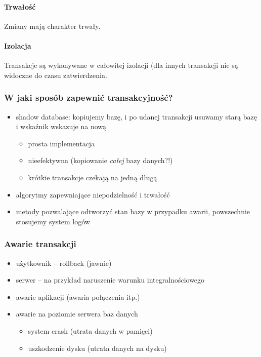 \documentclass[12pt]{article}
\begin{document}
\paragraph{Trwałość}
Zmiany mają charakter trwały.

\paragraph{Izolacja}
Transakcje są wykonywane w całowitej izolacji (dla innych transakcji nie są widoczne
do czasu zatwierdzenia.

\begin{comment}

Stany transakcji:

 active -> partially commited -> commited
 active -> failed
 partially commited -> failed -> aborted

 Gdy nastąpi awaria, to tranakcja zostaje w stanie dowolnym (!)
 Po restarcie SZBD przegląda niedokończone transakcje i doprowadza je do końca
\end{comment}

\subsubsection{W jaki sposób zapewnić transakcyjność?}
\begin{itemize}
  \item shadow database: kopiujemy bazę, i po udanej transakcji usuwamy starą bazę i wskaźnik wskazuje na nową
  \begin{itemize}
    \item prosta implementacja
    \item nieefektywna (kopiowanie \emph{całej} bazy danych?!)
    \item krótkie transakcje czekają na jedną długą
  \end{itemize}
  \item algorytmy zapewniające niepodzielność i trwałość
  \item metody pozwalające odtworzyć stan bazy w przypadku awarii, powszechnie stosujemy system logów
\end{itemize}
\subsubsection{Awarie transakcji}
\begin{itemize}
\item użytkownik -- rollback (jawnie)
\item serwer -- na przykład naruszenie warunku integralnościowego
\item awarie aplikacji (awaria połączenia itp.)
\item awarie na poziomie serwera baz danych
\begin{itemize}
  \item system crash (utrata danych w pamięci)
  \item uszkodzenie dysku (utrata danych na dysku)
  \end{itemize}
\end{itemize}
\end{document}
